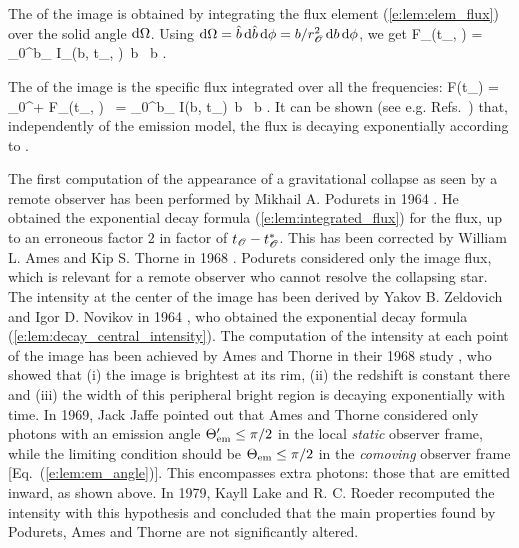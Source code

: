 The  of the image is obtained by integrating
the flux element (\ref{e:lem:elem_flux}) over the solid angle $\mathrm{d}\Omega$. Using
$\mathrm{d}\Omega = \hat{b}\, \mathrm{d}\hat{b}\, \mathrm{d}\phi = b/r_{\mathscr{O}}^2\, \mathrm{d} b\, \mathrm{d}\phi$, we get
\be
    F_\nu(t_\Obs, \nu) =  \int_0^{b_\star} I_\nu(b, t_\Obs, \nu)\, b \, \D b .
\ee

The  of the image is the specific flux integrated over all the frequencies:
\be
    F(t_\Obs) = \int_0^{+\infty} F_\nu(t_\Obs, \nu) \, \D \nu
     =  \int_0^{b_\star} I(b, t_\Obs)\, b \, \D b .
\ee
It can be shown (see e.g. Refs.~\cite{AmesT68,Shapi89}) that, independently of
the emission model, the flux is decaying exponentially according to
\be \label{e:lem:integrated_flux}
     .
\ee

\begin{hist}
The first computation of the appearance of a gravitational collapse as seen by a remote observer
has been performed by Mikhail A. Podurets in 1964 \cite{Podur64}.
He obtained the exponential decay formula (\ref{e:lem:integrated_flux}) for the flux,
up to an erroneous factor $2$ in factor of $t_{\mathscr{O}} - t_{\mathscr{O}}^*$. This has been
corrected by William L. Ames and Kip S. Thorne in 1968
\cite{AmesT68}. Podurets considered only the image flux, which is relevant for a remote observer who
cannot resolve the collapsing star. The intensity at the center of the image
has been derived by
Yakov B. Zeldovich and Igor D. Novikov
in 1964 \cite{ZeldoN64}, who obtained the exponential decay formula
(\ref{e:lem:decay_central_intensity}). The computation of the
intensity at each point of the image has been achieved by
Ames and Thorne in their 1968 study \cite{AmesT68}, who showed that (i)
the image is brightest at its rim, (ii) the redshift is constant there and (iii) the width of this
peripheral bright region is decaying exponentially with time. In 1969, Jack Jaffe
\cite{Jaffe69} pointed out that Ames and Thorne considered only photons with
an emission angle $\Theta_{\rm em}' \leq \pi/2$ in the local \emph{static} observer frame,
while the limiting condition should be $\Theta_{\rm em} \leq \pi/2$ in the \emph{comoving} observer
frame [Eq.~(\ref{e:lem:em_angle})].
This encompasses extra photons: those that are emitted inward, as shown above.
In 1979, Kayll Lake and
R. C. Roeder \cite{LakeR79}
recomputed the intensity with this hypothesis and concluded
that the main properties found by Podurets, Ames and Thorne are not significantly altered.
\end{hist}

